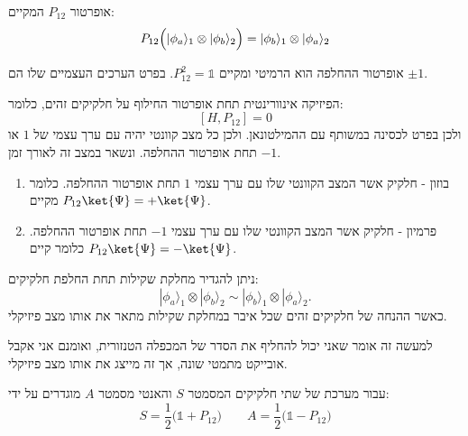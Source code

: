 \documentclass{tstextbook}
\begin{document}
\begin{definition}
אופרטור \(P_{12}\) המקיים:
$$P_{12}\Bigl(|\phi_{a}\rangle_{1}\otimes|\phi_{b}\rangle_{2}\Bigr)=|\phi_{b}\rangle_{1}\otimes|\phi_{a}\rangle_{2}$$

\end{definition}
\begin{corollary}
אופרטור ההחלפה הוא הרמיטי ומקיים \(P^{2}_{12}=\mathbb{1}\). בפרט הערכים העצמיים שלו הם \(\pm 1\).

\end{corollary}
\begin{proposition}
הפיזיקה אינוורינטית תחת אופרטור החילוף על חלקיקים זהים, כלומר:
$$[H,P_{12}]=0$$
ולכן בפרט לכסינה במשותף עם ההמילטונאן. ולכן כל מצב קוונטי יהיה עם ערך עצמי של \(1\) או \(-1\) תחת אופרטור ההחלפה. ונשאר במצב זה לאורך זמן.

\end{proposition}
\begin{definition}
  \begin{enumerate}
    \item בוזון - חלקיק אשר המצב הקוונטי שלו עם ערך עצמי \(1\) תחת אופרטור ההחלפה. כלומר מקיים \(P_{12}\ket{\Psi}=+\ket{\Psi}\). 


    \item פרמיון - חלקיק אשר המצב הקוונטי שלו עם ערך עצמי \(-1\) תחת אופרטור ההחלפה. כלומר קיים \(P_{12}\ket{\Psi}=-\ket{\Psi}\). 


  \end{enumerate}
\end{definition}
\begin{proposition}
ניתן להגדיר מחלקת שקילות תחת החלפת חלקיקים:
$$|\phi_{a}\rangle_{1}\otimes|\phi_{b}\rangle_{2}\sim|\phi_{b}\rangle_{1}\otimes|\phi_{a}\rangle_{2}.$$
כאשר ההנחה של חלקיקים זהים שכל איבר במחלקת שקילות מתאר את אותו מצב פיזיקלי. 

\end{proposition}
\begin{remark}
למעשה זה אומר שאני יכול להחליף את הסדר של המכפלה הטנזורית, ואומנם אני אקבל אובייקט מתמטי שונה, אך זה מייצג את אותו מצב פיזיקלי. 

\end{remark}
\begin{definition}
עבור מערכת של שתי חלקיקים המסמטר \(S\) והאנטי מסמטר \(A\) מוגדרים על ידי:
$$S=\frac{1}{2}\Big(\mathbb{1} +P_{12}\Big)\qquad A=\frac{1}{2}\Big(\mathbb{1} -P_{12}\Big)$$

\end{definition}
\end{document}
